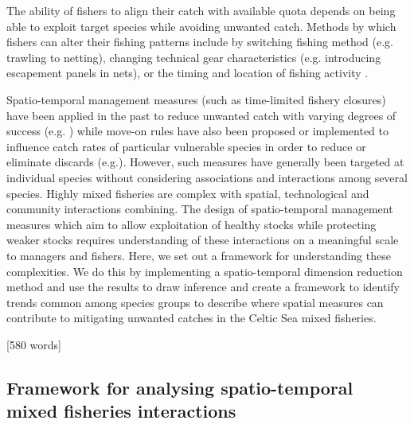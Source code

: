 \documentclass{nature}
\begin{document}
\begin{linenumbers}
The ability of fishers to align their catch with available quota depends on
being able to exploit target species while avoiding unwanted catch. Methods by
which fishers can alter their fishing patterns include by switching fishing
method (e.g. trawling to netting), changing technical gear characteristics
(e.g.  introducing escapement panels in nets), or the timing and location of
fishing activity \cite{Fulton2011b, vanPutten2012a}.

Spatio-temporal management measures (such as time-limited fishery closures)
have been applied in the past to reduce unwanted catch with varying degrees of
success (e.g.  \cite{Needle2011, Holmes2011, Beare2010, Dinmore2003}) while
move-on rules have also been proposed or implemented to influence catch rates
of particular vulnerable species in order to reduce or eliminate discards
(e.g.\cite{Gardner2008, Dunn2011, Dunn2014a}). However, such measures have
generally been targeted at individual species without considering associations
and interactions among several species. Highly mixed fisheries are complex with
spatial, technological and community interactions combining. The design of
spatio-temporal management measures which aim to allow exploitation of healthy
stocks while protecting weaker stocks requires understanding of these
interactions on a meaningful scale to managers and fishers. Here, we set out a
framework for understanding these complexities. We do this by implementing a
spatio-temporal dimension reduction method and use the results to draw
inference and create a framework to identify trends common among species groups
to describe where spatial measures can contribute to mitigating unwanted
catches in the Celtic Sea mixed fisheries.

[580 words]

\subsection{Framework for analysing spatio-temporal mixed fisheries
	interactions}


\end{linenumbers}
\end{document}
